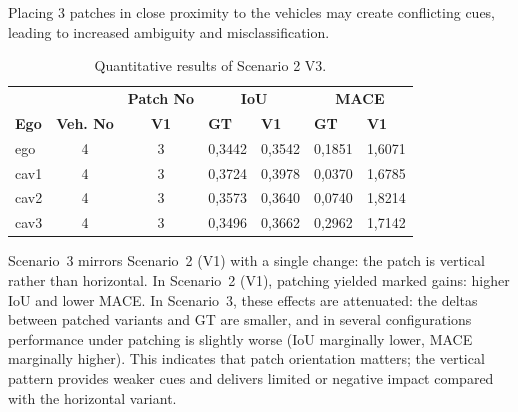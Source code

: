 Placing 3 patches in close proximity to the vehicles may create conflicting cues, leading to increased ambiguity and misclassification.
\begin{table}[tph]
    \centering
    \caption{Quantitative results of Scenario 2 V3.}
    \label{tab:scenario2v3_results}
    \begin{tabularx}{\textwidth}{l c c *{4}{X}}
        \toprule
                         &             & \multicolumn{1}{c}{\textbf{Patch No}} & \multicolumn{2}{c}{\textbf{IoU}} & \multicolumn{2}{c}{\textbf{MACE}}                   \\
        \cmidrule(lr){4-5}\cmidrule(lr){6-7}
        \textbf{Ego}     &
        \textbf{Veh. No} &
        \textbf{V1}      &
        \textbf{GT}      & \textbf{V1} &
        \textbf{GT}      & \textbf{V1}                                                                                                                                  \\
        \midrule
        ego              & 4           & 3                                     & 0,3442                           & 0,3542                            & 0,1851 & 1,6071 \\
        cav1             & 4           & 3                                     & 0,3724                           & 0,3978                            & 0,0370 & 1,6785 \\
        cav2             & 4           & 3                                     & 0,3573                           & 0,3640                            & 0,0740 & 1,8214 \\
        cav3             & 4           & 3                                     & 0,3496                           & 0,3662                            & 0,2962 & 1,7142 \\
        \bottomrule
    \end{tabularx}
\end{table}
Scenario~3 mirrors Scenario~2 (V1) with a single change: the patch is vertical rather than horizontal.
In Scenario~2 (V1), patching yielded marked gains: higher IoU and lower MACE.
In Scenario~3, these effects are attenuated: the deltas between patched variants and GT are smaller, and in several configurations performance under patching is slightly worse (IoU marginally lower, MACE marginally higher).
This indicates that patch orientation matters; the vertical pattern provides weaker cues and delivers limited or negative impact compared with the horizontal variant.
